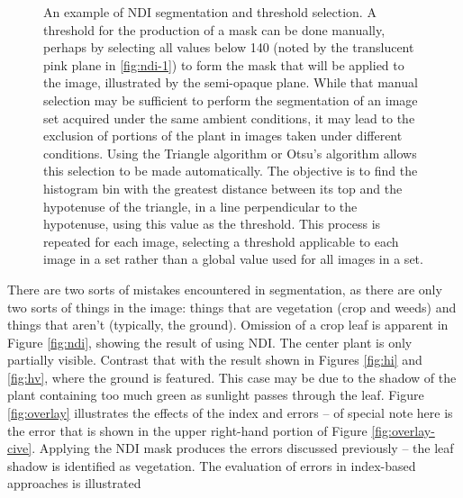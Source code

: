 \documentclass[agriculture,article,submit,pdftex,moreauthors]{Definitions/mdpi}
\begin{document}
\begin{figure}[H]
	\caption[NDI segmentation and threshold selection]{An example of NDI segmentation and threshold selection. A threshold for the production of a mask can be done manually, perhaps by selecting all values below 140 (noted by the translucent pink plane in \ref{fig:ndi-1}) to form the mask that will be applied to the image, illustrated by the semi-opaque plane. While that manual selection may be sufficient to perform the segmentation of an image set acquired under the same ambient conditions, it may lead to the exclusion of portions of the plant in images taken under different conditions. Using the Triangle algorithm \cite{Brink1996-xy,Zack1977-yl} or Otsu's algorithm allows this selection to be made automatically. The objective is to find the histogram bin with the greatest distance between its top and the hypotenuse of the triangle, in a line perpendicular to the hypotenuse, using this value as the threshold. This process is repeated for each image, selecting a threshold applicable to each image in a set rather than a global value used for all images in a set.}
	\label{fig:ndi-segmentation}
\end{figure}



There are two sorts of mistakes encountered in segmentation, as there are only two sorts of things in the image: things that are vegetation (crop and weeds) and things that aren't (typically, the ground). Omission of a crop leaf is apparent in Figure \ref{fig:ndi}, showing the result of using NDI.  The center plant is only partially visible. Contrast that with the result shown in Figures \ref{fig:hi} and  \ref{fig:hv}, where the ground is featured. This case may be due to the shadow of the plant containing too much green as sunlight passes through the leaf. Figure \ref{fig:overlay} illustrates the effects of the index and errors -- of special note here is the error that is shown in the upper right-hand portion of Figure \ref{fig:overlay-cive}. Applying the NDI mask produces the errors discussed previously -- the leaf shadow is identified as vegetation. The evaluation of errors in index-based approaches is illustrated 
\end{document}
